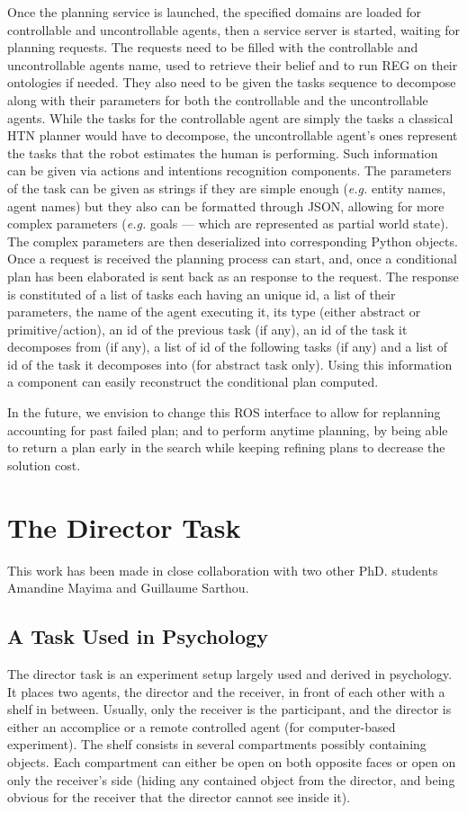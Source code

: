\documentclass[a4paper,11pt,twoside]{StyleThese}
\begin{document}
Once the planning service is launched, the specified domains are loaded for controllable and uncontrollable agents, then a service server is started, waiting for planning requests. 
The requests need to be filled with the controllable and uncontrollable agents name, used to retrieve their belief and to run REG on their ontologies if needed. 
They also need to be given the tasks sequence to decompose along with their parameters for both the controllable and the uncontrollable agents. While the tasks for the controllable agent are simply the tasks a classical HTN planner would have to decompose, the uncontrollable agent's ones represent the tasks that the robot estimates the human is performing. Such information can be given via actions and intentions recognition components. The parameters of the task can be given as strings if they are simple enough (\textit{e.g.} entity names, agent names) but they also can be formatted through JSON, allowing for more complex parameters (\textit{e.g.} goals --- which are represented as partial world state). The complex parameters are then deserialized into corresponding Python objects.
Once a request is received the planning process can start, and, once a conditional plan has been elaborated is sent back as an response to the request. The response is constituted of a list of tasks each having an unique id, a list of their parameters, the name of the agent executing it, its type (either abstract or primitive/action), an id of the previous task (if any), an id of the task it decomposes from (if any), a list of id of the following tasks (if any) and a list of id of the task it decomposes into (for abstract task only). Using this information a component can easily reconstruct the conditional plan computed.

In the future, we envision to change this ROS interface to allow for replanning accounting for past failed plan; and to perform anytime planning, by being able to return a plan early in the search while keeping refining plans to decrease the solution cost.

\section{The Director Task}
This work has been made in close collaboration with two other PhD. students Amandine Mayima and Guillaume Sarthou.

\subsection{A Task Used in Psychology}
The director task is an experiment setup largely used and derived in psychology. It places two agents, the director and the receiver, in front of each other with a shelf in between. Usually, only the receiver is the participant, and the director is either an accomplice or a remote controlled agent (for computer-based experiment). The shelf consists in several compartments possibly containing objects. Each compartment can either be open on both opposite faces or open on only the receiver's side (hiding any contained object from the director, and being obvious for the receiver that the director cannot see inside it).
\end{document}
